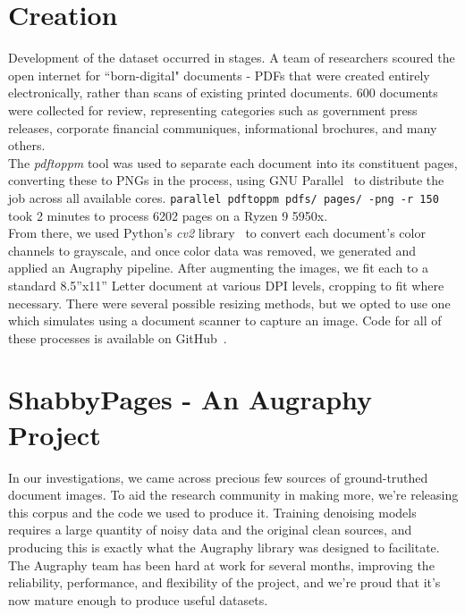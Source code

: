 \documentclass[runningheads]{llncs}
\begin{document}
\section{Creation}
Development of the dataset occurred in stages. A team of researchers scoured the open internet for ``born-digital" documents - PDFs that were created entirely electronically, rather than scans of existing printed documents. 600 documents were collected for review, representing categories such as government press releases, corporate financial communiques, informational brochures, and many others.\\

The \textit{pdftoppm} tool was used to separate each document into its constituent pages, converting these to PNGs in the process, using GNU Parallel~\cite{ref_parallel} to distribute the job across all available cores. \texttt{parallel pdftoppm pdfs/{} pages/{} -png -r 150} took 2 minutes to process 6202 pages on a Ryzen 9 5950x.\\

From there, we used Python's \textit{cv2} library~\cite{ref_opencv} to convert each document's color channels to grayscale, and once color data was removed, we generated and applied an Augraphy pipeline. After augmenting the images, we fit each to a standard 8.5''x11'' Letter document at various DPI levels, cropping to fit where necessary. There were several possible resizing methods, but we opted to use one which simulates using a document scanner to capture an image.  Code for all of these processes is available on GitHub~\cite{ref_shabby}.

\section{ShabbyPages - An Augraphy Project}
In our investigations, we came across precious few sources of ground-truthed document images. To aid the research community in making more, we're releasing this corpus and the code we used to produce it. Training denoising models requires a large quantity of noisy data and the original clean sources, and producing this is exactly what the Augraphy library was designed to facilitate. The Augraphy team has been hard at work for several months, improving the reliability, performance, and flexibility of the project, and we're proud that it's now mature enough to produce useful datasets.\\
\end{document}
